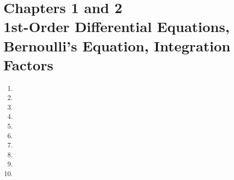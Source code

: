 \section{Chapters 1 and 2\\{\large 1st-Order Differential Equations, Bernoulli’s Equation, Integration Factors}}

\begin{enumerate}[label=\textbf{\Alph*.}]
	\setlength{\itemsep}{\bigskipamount}
	\item
		

	\item
		

	\item
		

	\item
		

	\item
		

	\item
		

	\item
		

	\item
		

	\item
		

	\item
		

\end{enumerate}